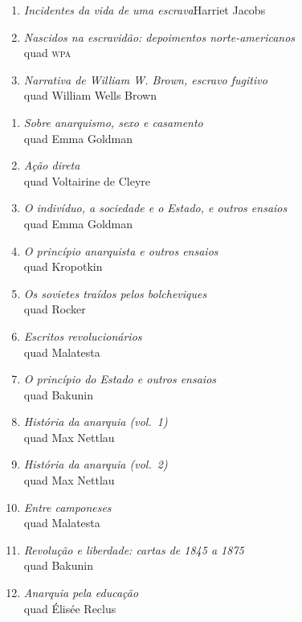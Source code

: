 \begin{enumerate}
\setlength\parskip{4.2pt}
\setlength\itemsep{-1.4mm}
\item \textit{Incidentes da vida de uma escrava}\quad Harriet Jacobs
\item \textit{Nascidos na escravidão: depoimentos norte-americanos}\\quad \textsc{wpa}
\item \textit{Narrativa de William W. Brown, escravo fugitivo}\\quad William Wells Brown
\end{enumerate}

\medskip
{}

\begin{enumerate}
\setlength\parskip{4.2pt}
\setlength\itemsep{-1.4mm}
\item \textit{Sobre anarquismo, sexo e casamento}\\quad Emma Goldman
\item \textit{Ação direta}\\quad Voltairine de Cleyre
\item \textit{O indivíduo, a sociedade e o Estado, e outros ensaios}\\quad Emma Goldman
\item \textit{O princípio anarquista e outros ensaios}\\quad Kropotkin
\item \textit{Os sovietes traídos pelos bolcheviques}\\quad Rocker
\item \textit{Escritos revolucionários}\\quad Malatesta
\item \textit{O princípio do Estado e outros ensaios}\\quad Bakunin
\item \textit{História da anarquia (vol.~1)}\\quad Max Nettlau
\item \textit{História da anarquia (vol.~2)}\\quad Max Nettlau
\item \textit{Entre camponeses}\\quad Malatesta
\item \textit{Revolução e liberdade: cartas de 1845 a 1875}\\quad Bakunin
\item \textit{Anarquia pela educação}\\quad Élisée Reclus 
\end{enumerate}

